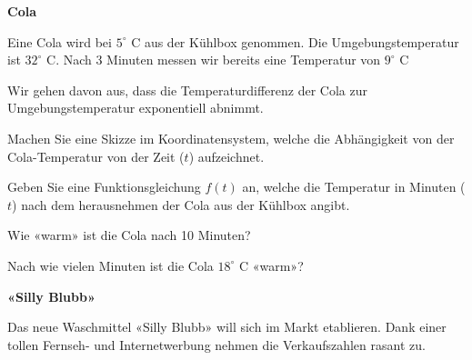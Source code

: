 

\bbwActAufgabenNr{} \textbf{Cola}

Eine Cola wird bei $5^\circ \textrm{ C}$ aus der Kühlbox genommen. Die
Umgebungstemperatur ist $32^\circ \textrm{ C}$. Nach 3 Minuten messen
wir bereits eine Temperatur von $9^\circ \textrm{ C}$ 

Wir gehen davon aus, dass die Temperaturdifferenz der Cola zur
Umgebungstemperatur exponentiell abnimmt.

\begin{bbwAufgabenBlock}
\item Machen Sie eine Skizze im Koordinatensystem, welche die
Abhängigkeit von der Cola-Temperatur von der Zeit ($t$) aufzeichnet.


\item Geben Sie eine Funktionsgleichung $f(t)$ an, welche die
Temperatur in Minuten ($t$) nach dem herausnehmen der Cola aus der Kühlbox
angibt.


\item Wie «warm» ist die Cola nach 10 Minuten?


\item Nach wie vielen Minuten ist die Cola $18^\circ \textrm{ C}$
«warm»?


\end{bbwAufgabenBlock}


\platzFuerBerechnungenBisEndeSeite{}




\bbwActAufgabenNr{} \textbf{«Silly Blubb»}

Das neue Waschmittel «Silly Blubb» will sich im Markt etablieren.
Dank einer tollen Fernseh- und Internetwerbung nehmen die
Verkaufszahlen rasant zu.

